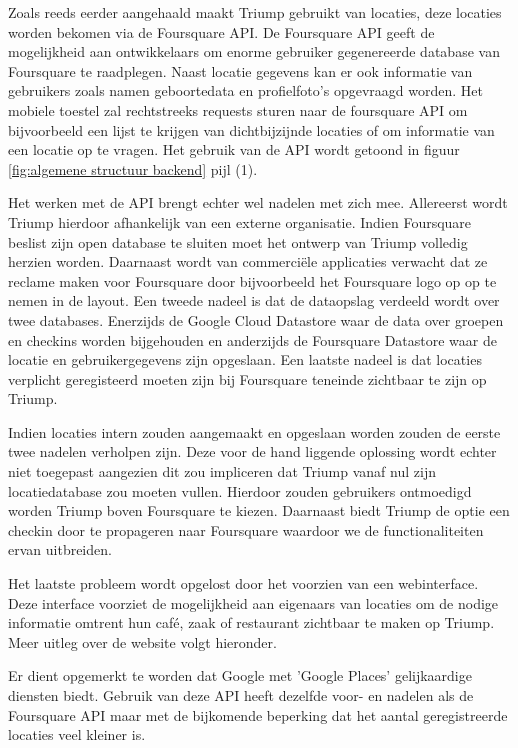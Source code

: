 Zoals reeds eerder aangehaald maakt Triump gebruikt van locaties, deze locaties worden bekomen via de Foursquare API. De Foursquare API geeft de mogelijkheid aan ontwikkelaars om enorme gebruiker gegenereerde database van Foursquare te raadplegen. Naast locatie gegevens kan er ook informatie van gebruikers zoals namen geboortedata en profielfoto's opgevraagd worden.  Het mobiele toestel zal rechtstreeks requests sturen naar de foursquare API om bijvoorbeeld een lijst te krijgen van dichtbijzijnde locaties of om informatie van een locatie op te vragen. Het gebruik van de API wordt getoond in figuur \ref{fig:algemene structuur backend} pijl (1).

Het werken met de API brengt echter wel nadelen met zich mee.
Allereerst wordt Triump hierdoor afhankelijk van een externe organisatie. Indien Foursquare beslist zijn open database te sluiten moet het ontwerp van Triump volledig herzien worden. Daarnaast wordt van commerciële applicaties verwacht dat ze reclame maken voor Foursquare door bijvoorbeeld het Foursquare logo op op te nemen in de layout.  Een tweede nadeel is dat de dataopslag verdeeld wordt over twee databases. Enerzijds de Google Cloud Datastore waar de data over groepen en checkins worden bijgehouden en anderzijds de Foursquare Datastore waar de locatie en gebruikergegevens zijn opgeslaan. Een laatste nadeel is dat locaties verplicht geregisteerd moeten zijn bij Foursquare teneinde zichtbaar te zijn op Triump. 

Indien locaties intern zouden aangemaakt en opgeslaan worden zouden de eerste twee nadelen verholpen zijn. 
Deze voor de hand liggende oplossing wordt echter niet toegepast aangezien dit zou impliceren dat Triump vanaf nul zijn locatiedatabase zou moeten vullen. Hierdoor zouden gebruikers ontmoedigd worden Triump boven Foursquare te kiezen. Daarnaast biedt Triump de optie een checkin door te propageren naar Foursquare waardoor we de functionaliteiten ervan uitbreiden. %

Het laatste probleem wordt opgelost door het voorzien van een webinterface. Deze interface voorziet de mogelijkheid aan eigenaars van locaties om de nodige informatie omtrent hun café, zaak of restaurant zichtbaar te maken op Triump. Meer uitleg over de website volgt hieronder.

Er dient opgemerkt te worden dat Google met 'Google Places' gelijkaardige diensten biedt. Gebruik van deze API heeft dezelfde voor- en nadelen als de Foursquare API maar met de bijkomende beperking dat het aantal geregistreerde locaties veel kleiner is.


